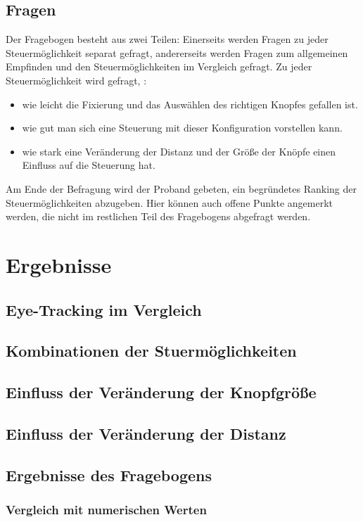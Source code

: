 \subsection{Fragen}
Der Fragebogen besteht aus zwei Teilen: Einerseits werden Fragen zu jeder Steuermöglichkeit separat gefragt, andererseits werden Fragen zum allgemeinen Empfinden und den Steuermöglichkeiten im Vergleich gefragt.
Zu jeder Steuermöglichkeit wird gefragt, :
\begin{itemize}
	\item wie leicht die Fixierung und das Auswählen des richtigen Knopfes gefallen ist.
	\item wie gut man sich eine Steuerung mit dieser Konfiguration vorstellen kann.
	\item wie stark eine Veränderung der Distanz und der Größe der Knöpfe einen Einfluss auf die Steuerung hat.
\end{itemize}
Am Ende der Befragung wird der Proband gebeten, ein begründetes Ranking der Steuermöglichkeiten abzugeben. Hier können auch offene Punkte angemerkt werden, die nicht im restlichen Teil des Fragebogens abgefragt werden.


\section{Ergebnisse}
\subsection{Eye-Tracking im Vergleich}
\subsection{Kombinationen der Stuermöglichkeiten}
\subsection{Einfluss der Veränderung der Knopfgröße}
\subsection{Einfluss der Veränderung der Distanz}
\subsection{Ergebnisse des Fragebogens}
\subsubsection{Vergleich mit numerischen Werten}
